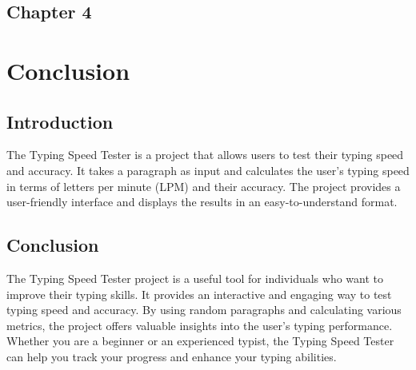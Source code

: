 \begin{center}
    \section*{\fontsize{20}{20}\selectfont Chapter 4}
\end{center}
\vspace{10mm}

\section{Conclusion}

\subsection{Introduction}
The Typing Speed Tester is a project that allows users to test their typing speed and accuracy. It takes a paragraph as input and calculates the user's typing speed in terms of letters per minute (LPM) and their accuracy. The project provides a user-friendly interface and displays the results in an easy-to-understand format.

\subsection{Conclusion}
The Typing Speed Tester project is a useful tool for individuals who want to improve their typing skills. It provides an interactive and engaging way to test typing speed and accuracy. By using random paragraphs and calculating various metrics, the project offers valuable insights into the user's typing performance. Whether you are a beginner or an experienced typist, the Typing Speed Tester can help you track your progress and enhance your typing abilities.



 





